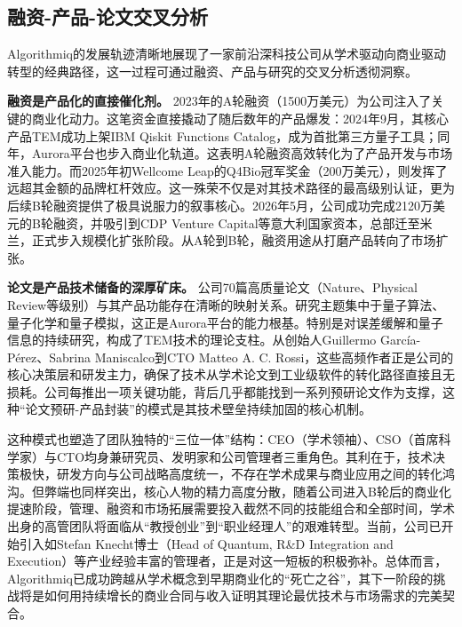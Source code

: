 \documentclass[11pt,a4paper]{ctexart}
\begin{document}
\subsection{融资-产品-论文交叉分析}

Algorithmiq的发展轨迹清晰地展现了一家前沿深科技公司从学术驱动向商业驱动转型的经典路径，这一过程可通过融资、产品与研究的交叉分析透彻洞察。

\textbf{融资是产品化的直接催化剂。} 2023年的A轮融资（1500万美元）为公司注入了关键的商业化动力。这笔资金直接撬动了随后数年的产品爆发：2024年9月，其核心产品TEM成功上架IBM Qiskit Functions Catalog，成为首批第三方量子工具；同年，Aurora平台也步入商业化轨道。这表明A轮融资高效转化为了产品开发与市场准入能力。而2025年初Wellcome Leap的Q4Bio冠军奖金（200万美元），则发挥了远超其金额的品牌杠杆效应。这一殊荣不仅是对其技术路径的最高级别认证，更为后续B轮融资提供了极具说服力的叙事核心。2026年5月，公司成功完成2120万美元的B轮融资，并吸引到CDP Venture Capital等意大利国家资本，总部迁至米兰，正式步入规模化扩张阶段。从A轮到B轮，融资用途从打磨产品转向了市场扩张。

\textbf{论文是产品技术储备的深厚矿床。} 公司70篇高质量论文（Nature、Physical Review等级别）与其产品功能存在清晰的映射关系。研究主题集中于量子算法、量子化学和量子模拟，这正是Aurora平台的能力根基。特别是对误差缓解和量子信息的持续研究，构成了TEM技术的理论支柱。从创始人Guillermo García-Pérez、Sabrina Maniscalco到CTO Matteo A. C. Rossi，这些高频作者正是公司的核心决策层和研发主力，确保了技术从学术论文到工业级软件的转化路径直接且无损耗。公司每推出一项关键功能，背后几乎都能找到一系列预研论文作为支撑，这种“论文预研-产品封装”的模式是其技术壁垒持续加固的核心机制。

这种模式也塑造了团队独特的“三位一体”结构：CEO（学术领袖）、CSO（首席科学家）与CTO均身兼研究员、发明家和公司管理者三重角色。其利在于，技术决策极快，研发方向与公司战略高度统一，不存在学术成果与商业应用之间的转化鸿沟。但弊端也同样突出，核心人物的精力高度分散，随着公司进入B轮后的商业化提速阶段，管理、融资和市场拓展需要投入截然不同的技能组合和全部时间，学术出身的高管团队将面临从“教授创业”到“职业经理人”的艰难转型。当前，公司已开始引入如Stefan Knecht博士（Head of Quantum, R\&D Integration and Execution）等产业经验丰富的管理者，正是对这一短板的积极弥补。总体而言，Algorithmiq已成功跨越从学术概念到早期商业化的“死亡之谷”，其下一阶段的挑战将是如何用持续增长的商业合同与收入证明其理论最优技术与市场需求的完美契合。
\end{document}
